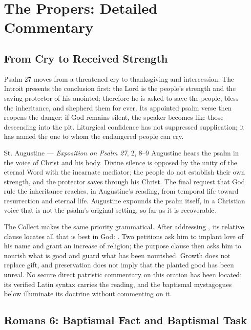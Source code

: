 \section*{The Propers: Detailed Commentary}

\subsection*{From Cry to Received Strength\enspace{}}

Psalm 27 moves from a threatened cry to thanksgiving and intercession. The Introit presents the conclusion first: the Lord is the people's strength and the saving protector of his anointed; therefore he is asked to save the people, bless the inheritance, and shepherd them for ever. Its appointed psalm verse then reopens the danger: if God remains silent, the speaker becomes like those descending into the pit. Liturgical confidence has not suppressed supplication; it has named the one to whom the endangered people can cry.

\begin{sourcecard}{St. Augustine --- \emph{Exposition on Psalm 27}, 2, 8--9}
Augustine hears the psalm in the voice of Christ and his body. Divine silence is opposed by the unity of the eternal Word with the incarnate mediator; the people do not establish their own strength, and the protector saves through his Christ. The final request that God rule the inheritance reaches, in Augustine's reading, from temporal life toward resurrection and eternal life. Augustine expounds the psalm itself, in a Christian voice that is not the psalm's original setting, so far as it is recoverable.
\end{sourcecard}

The Collect makes the same priority grammatical. After addressing , its relative clause locates all that is best in God: . Two petitions ask him to implant love of his name and grant an increase of religion; the purpose clause then asks him to nourish what is good and guard what has been nourished. Growth does not replace gift, and preservation does not imply that the planted good has been unreal. No secure direct patristic commentary on this oration has been located; its verified Latin syntax carries the reading, and the baptismal mystagogues below illuminate its doctrine without commenting on it.

\sectionguard
\subsection*{Romans 6: Baptismal Fact and Baptismal Task\enspace{}}

